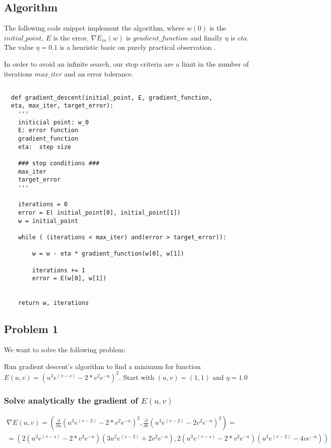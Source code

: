 \subsection{Algorithm}

The following code snippet implement the algorithm, where $w(0)$ is the $initial\_point$, $E$ is the error, $\nabla E_{in}(w)$ is $gradient\_function$ and
finally $\eta$ is $eta.$ The value $\eta = 0.1$ is a heuristic basic on purely practical observation \cite{LFD}.


In order to avoid an infinite search, our stop criteria are a limit in the number of iterations $max\_iter$ and an error tolerance. 

\begin{verbatim}

  def gradient_descent(initial_point, E, gradient_function,
  eta, max_iter, target_error):
    '''
    initicial point: w_0 
    E: error function 
    gradient_function
    eta:  step size 

    ### stop conditions ###
    max_iter
    target_error
    '''

    iterations = 0
    error = E( initial_point[0], initial_point[1])
    w = initial_point
  
    while ( (iterations < max_iter) and(error > target_error)): 

        w = w - eta * gradient_function(w[0], w[1])
        
        iterations += 1
        error = E(w[0], w[1])
 
    
    return w, iterations

\end{verbatim}

\subsection{Problem 1}

We want to solve the following problem: %

Run gradient descent's algorithm to find a minimum for
function $E(u,v) = (u^3 e^{(v-s)} - 2* v^2 e^{-u})^2.$
Start with $(u,v)=(1,1)$ and $\eta = 1.0$


\subsubsection{Solve analytically the gradient of $E(u,v)$}


\begin{multline*}
  \nabla E(u,v) = \left( \frac{\partial}{\partial u}(u^3 e^{(v-2)} - 2* v^2 e^{-u})^2 , \frac{\partial}{\partial v} (u^3 e^{(v-2)} - 2 v^2 e^{-u})^2 \right) = \\
 =  \left(2(u^3 e^{(v-s)} - 2* v^2 e^{-u})(3u^2e^{(v-2)} + 2 v^2 e^{-u} ), 2(u^3 e^{(v-s)} - 2* v^2 e^{-u})(u^3 e^{(v-2)} - 4 v e^{-u}) \right)
\end{multline*}


